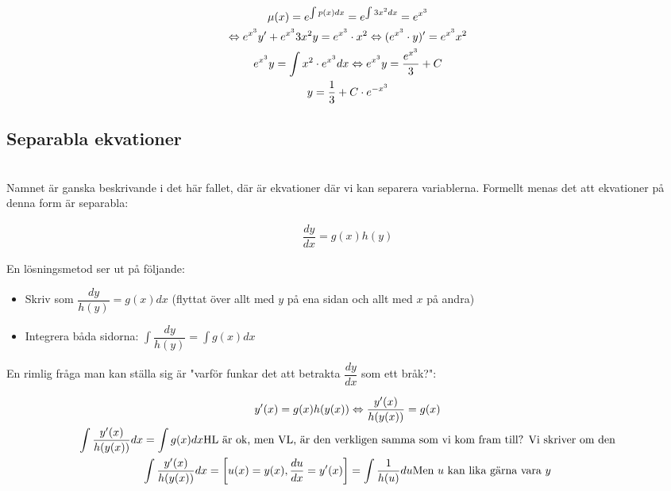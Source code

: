 \begin{equation*}
  \begin{gathered}
    \mu(x)=e^{\int p(x)dx}=e^{\int 3x^2dx}=e^{x^3}\\
    \Leftrightarrow e^{x^3}y^{\prime}+e^{x^3} 3x^2y=e^{x^3}\cdot x^2 \Leftrightarrow (e^{x^3}\cdot y)^{\prime}=e^{x^3}x^2\\
    e^{x^3}y=\int x^2\cdot e^{x^3}dx \Leftrightarrow e^{x^3}y=\dfrac{e^{x^3}}{3}+C\\
    y=\dfrac{1}{3}+C\cdot e^{-x^3}
  \end{gathered}
\end{equation*}
\par\bigskip

\subsection{Separabla ekvationer}\hfill\\

\noindent Namnet är ganska beskrivande i det här fallet, där är ekvationer där vi kan separera variablerna. Formellt menas det att ekvationer på denna form är separabla:
\par\bigskip

\begin{equation*}
  \begin{gathered}
    \dfrac{dy}{dx}=g(x)h(y)
  \end{gathered}
\end{equation*}
\par\bigskip

\noindent En lösningsmetod ser ut på följande:
\par\bigskip
\begin{itemize}
  \item Skriv som $\dfrac{dy}{h(y)}=g(x)dx$ (flyttat över allt med $y$ på ena sidan och allt med $x$ på andra)
  \item Integrera båda sidorna: $\int\dfrac{dy}{h(y)}=\int g(x)dx$
\end{itemize}
\par\bigskip
\noindent En rimlig fråga man kan ställa sig är "varför funkar det att betrakta $\dfrac{dy}{dx}$ som ett bråk?":
\par\bigskip

\begin{equation*}
  \begin{gathered}
    y^{\prime}(x)=g(x)h(y(x)) \Leftrightarrow \dfrac{y^{\prime}(x)}{h(y(x))}=g(x)\\
    \int\dfrac{y^{\prime}(x)}{h(y(x))}dx = \int g(x)dx \text{HL är ok, men VL, är den verkligen samma som vi kom fram till? Vi skriver om den}\\
    \int\dfrac{y^{\prime}(x)}{h(y(x))}dx = \left[u(x)=y(x), \dfrac{du}{dx}=y^{\prime}(x)\right] = \int\dfrac{1}{h(u)}du \text{Men $u$ kan lika gärna vara $y$}
  \end{gathered}
\end{equation*}
\par\bigskip

